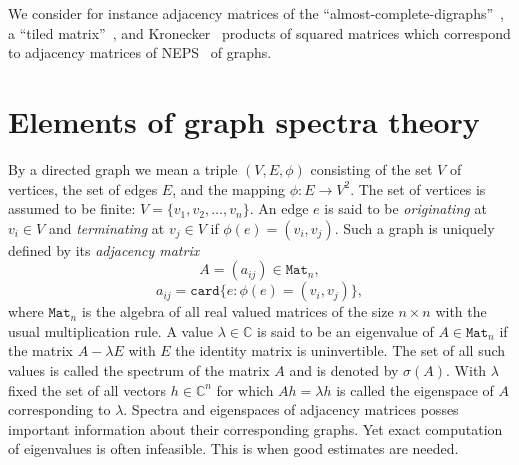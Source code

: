 \documentclass[14pt,a4paper]{extarticle}
\theoremstyle{definition}
\begin{document}
We consider for instance adjacency matrices of the
``almost-complete-digraphs''~\cite{Koz17,sergekozlukov@vspu},
a ``tiled matrix''~\cite{Koz18,sergekozlukov@currentproblems}, and
Kronecker~\cite{Koz18,sergekozlukov@currentproblems,bellman-matrices-kron,XIANG2005210}
products of squared matrices
which correspond to adjacency matrices of NEPS~\cite{cvetkovic1997eigenspaces} of graphs.

\section{Elements of graph spectra theory}
By a directed graph we mean a triple \((V, E, \phi)\) consisting
of the set \( V \) of vertices, the set of edges \( E \),
and the mapping \( \phi: E\to V^2\). The set of vertices is assumed
to be finite: \( V = \{ v_1, v_2, \ldots, v_n \}\).
An edge \( e \) is said to be \emph{originating} at \( v_i\in V \)
and \emph{terminating} at \( v_j\in V \)
if \( \phi(e)=(v_i, v_j)\).
Such a graph is uniquely defined by its \emph{adjacency matrix}
\[ A = ( a_{ij} ) \in \mathtt{Mat}_n, \]
\[ a_{ij} = \mathtt{card}\{ e: \phi(e)=(v_i, v_j)\}, \]
where \( \mathtt{Mat}_n \) is the algebra of all real valued matrices of the size
\( n{\times}n \) with the usual multiplication rule.
A value \( \lambda \in \mathbb{C} \) is said to be an eigenvalue of \(
A\in\mathtt{Mat}_n \) if the matrix \( A - \lambda E \) with \( E \) the
identity matrix is uninvertible. The set of all such values is called the
spectrum of the matrix \( A \) and is denoted by \( \sigma(A) \).
With \( \lambda \) fixed the set of all vectors \( h\in\mathbb{C}^n \)
for which \( A h = \lambda h \) is called the eigenspace of \( A \)
corresponding to \( \lambda \).
Spectra and eigenspaces of adjacency matrices posses important information about
their corresponding graphs. Yet exact computation of eigenvalues is often
infeasible. This is when good estimates are needed.
\end{document}
